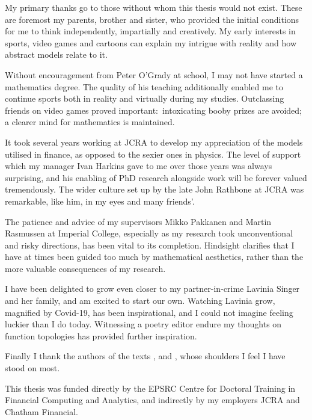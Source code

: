 My primary thanks go to those without whom this thesis would not exist. These are foremost my parents, brother and sister, who provided the initial conditions for me to think independently, impartially and creatively. My early interests in sports, video games and cartoons can explain my intrigue with reality and how abstract models relate to it.

Without encouragement from Peter O'Grady at school, I may not have started a mathematics degree. The quality of his teaching additionally enabled me to continue sports both in reality and virtually during my studies. Outclassing friends on video games proved important:~intoxicating booby prizes are avoided; a clearer mind for mathematics is maintained.

It took several years working at JCRA to develop my appreciation of the models utilised in finance, as opposed to the sexier ones in physics. The level of support which my manager Ivan Harkins gave to me over those years was always surprising, and his enabling of PhD research alongside work will be forever valued tremendously. The wider culture set up by the late John Rathbone at JCRA was remarkable, like him, in my eyes and many friends'.

The patience and advice of my supervisors Mikko Pakkanen and Martin Rasmussen at Imperial College, especially as my research took unconventional and risky directions, has been vital to its completion. Hindsight clarifies that I have at times been guided too much by mathematical aesthetics, rather than the more valuable consequences of my research.

I have been delighted to grow even closer to my partner-in-crime Lavinia Singer and her family, and am excited to start our own. Watching Lavinia grow, magnified by Covid-19, has been inspirational, and I could not imagine feeling luckier than I do today. Witnessing a poetry editor endure my thoughts on function topologies has provided further inspiration.

Finally I thank the authors of the texts \cite{coddington_1955}, \cite{agarwal_1993} and \cite{whitt_2002}, whose shoulders I feel I have stood on most.

\vspace{4mm}
This thesis was funded directly by the EPSRC Centre for Doctoral Training in Financial Computing and Analytics, and indirectly by my employers JCRA and Chatham Financial.

\setlength{\parskip}{0mm}
\renewcommand{\baselinestretch}{1.4}
\clearpage
\renewcommand{\contentsname}{Table of Contents}
{\tableofcontents}

\setlength{\parskip}{2mm}
\renewcommand{\baselinestretch}{1.5} %

\renewcommand{\listfigurename}{Figures}
\renewcommand{\listtablename}{Tables}
